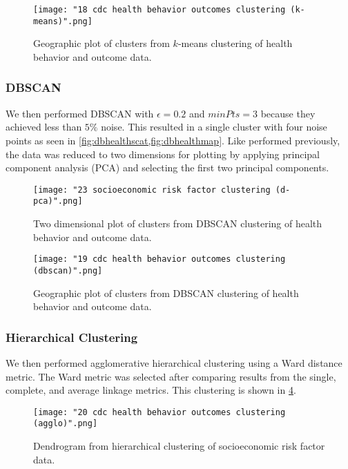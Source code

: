 \documentclass{article}
\begin{document}
\begin{figure}[h]
\centering
\caption{Geographic plot of clusters from $k$-means clustering of health behavior and outcome data.}
\texttt{[image: "18 cdc health behavior outcomes clustering (k-means)".png]}
\label{fig:kmeanshealthmap}
\end{figure}

\subsubsection{DBSCAN}
We then performed DBSCAN with $\epsilon = 0.2$ and $minPts = 3$ because they achieved less than $5\%$ noise. This resulted in a single cluster with four noise points as seen in \cref{fig:dbhealthscat,fig:dbhealthmap}. Like performed previously, the data was reduced to two dimensions for plotting by applying principal component analysis (PCA) and selecting the first two principal components.

\begin{figure}[h]
\centering
\caption{Two dimensional plot of clusters from DBSCAN clustering of health behavior and outcome data.}
\texttt{[image: "23 socioeconomic risk factor clustering (d-pca)".png]}
\label{fig:dbhealthscat}
\end{figure}

\begin{figure}[h]
\centering
\caption{Geographic plot of clusters from DBSCAN clustering of health behavior and outcome data.}
\texttt{[image: "19 cdc health behavior outcomes clustering (dbscan)".png]}
\label{fig:dbhealthmap}
\end{figure}

\subsubsection{Hierarchical Clustering}
We then performed agglomerative hierarchical clustering using a Ward distance metric. The Ward metric was selected after comparing results from the single, complete, and average linkage metrics. This clustering is shown in \ref{fig:dbhealthdg}.

\begin{figure}[h]
\centering
\caption{Dendrogram from hierarchical clustering of socioeconomic risk factor data.}
\texttt{[image: "20 cdc health behavior outcomes clustering (agglo)".png]}
\label{fig:dbhealthdg}
\end{figure}
\end{document}
